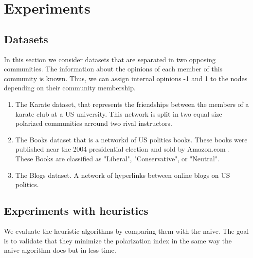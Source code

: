 \chapter{Experiments}
\label{ch:experiments}

\section{Datasets}
\label{sec:ds}

In this section we consider datasets that are separated in two opposing communities. The information about the opinions of each member of this community is known. Thus, we can assign internal opinions -1 and 1 to the nodes depending on their community membership\cite{tsapMatakosTerzi}. 

\begin{enumerate}

  \item The Karate dataset, that represents the friendships between the members of a karate club at a US university. This network is split in two equal size polarized communities arround two rival instructors.
  
  \item The Books dataset that is a networkd of US politics books. These books were published near the 2004 presidential election and sold by Amazon.com . These Books are classified as "Liberal", "Conservative", or "Neutral".
  
  \item The Blogs dataset. A network of hyperlinks between online blogs on US politics.
  
\end{enumerate}
\section{Experiments with heuristics}
\label{sec:experimHeuristics}

 We evaluate the heuristic algorithms by comparing them with the naive. The goal is to validate that they minimize the polarization index in the same way the naive algorithm does but in less time. 



